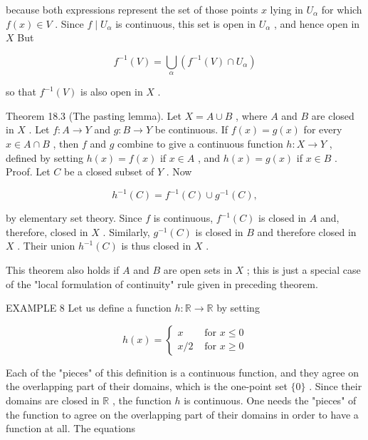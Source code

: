 because both expressions represent the set of those points \(x\) lying in \({U}_{\alpha }\) for which \(f\left( x\right)  \in  V\) . Since \(f \mid  {U}_{\alpha }\) is continuous, this set is open in \({U}_{\alpha }\) , and hence open in \(X\) But

\[
{f}^{-1}\left( V\right)  = \mathop{\bigcup }\limits_{\alpha }\left( {{f}^{-1}\left( V\right)  \cap  {U}_{\alpha }}\right)
\]

so that \({f}^{-1}\left( V\right)\) is also open in \(X\) .

Theorem 18.3 (The pasting lemma). Let \(X = A \cup  B\) , where \(A\) and \(B\) are closed in \(X\) . Let \(f : A \rightarrow  Y\) and \(g : B \rightarrow  Y\) be continuous. If \(f\left( x\right)  = g\left( x\right)\) for every \(x \in  A \cap  B\) , then \(f\) and \(g\) combine to give a continuous function \(h : X \rightarrow  Y\) , defined by setting \(h\left( x\right)  = f\left( x\right)\) if \(x \in  A\) , and \(h\left( x\right)  = g\left( x\right)\) if \(x \in  B\) . Proof. Let \(C\) be a closed subset of \(Y\) . Now

\[
{h}^{-1}\left( C\right)  = {f}^{-1}\left( C\right)  \cup  {g}^{-1}\left( C\right) ,
\]

by elementary set theory. Since \(f\) is continuous, \({f}^{-1}\left( C\right)\) is closed in \(A\) and, therefore, closed in \(X\) . Similarly, \({g}^{-1}\left( C\right)\) is closed in \(B\) and therefore closed in \(X\) . Their union \({h}^{-1}\left( C\right)\) is thus closed in \(X\) .

This theorem also holds if \(A\) and \(B\) are open sets in \(X\) ; this is just a special case of the "local formulation of continuity" rule given in preceding theorem.

EXAMPLE 8 Let us define a function \(h : \mathbb{R} \rightarrow  \mathbb{R}\) by setting

\[
h\left( x\right)  = \left\{  \begin{array}{ll} x & \text{ for }x \leq  0 \\  x/2 & \text{ for }x \geq  0 \end{array}\right.
\]

Each of the "pieces" of this definition is a continuous function, and they agree on the overlapping part of their domains, which is the one-point set \(\{ 0\}\) . Since their domains are closed in \(\mathbb{R}\) , the function \(h\) is continuous. One needs the "pieces" of the function to agree on the overlapping part of their domains in order to have a function at all. The equations

